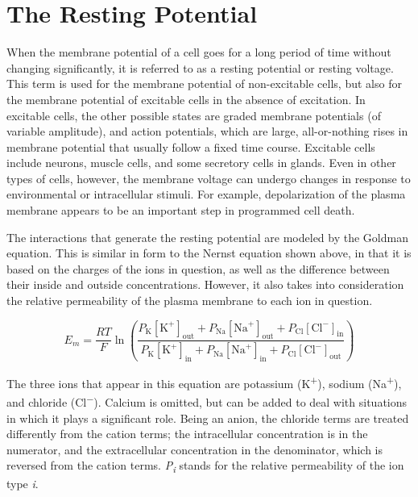 \hypertarget{the-resting-potential}{%
\section{The Resting Potential}\label{the-resting-potential}}

When the membrane potential of a cell goes for a long period of time without changing significantly, it is referred to as a resting potential or resting voltage. This term is used for the membrane potential of non-excitable cells, but also for the membrane potential of excitable cells in the absence of excitation. In excitable cells, the other possible states are graded membrane potentials (of variable amplitude), and action potentials, which are large, all-or-nothing rises in membrane potential that usually follow a fixed time course. Excitable cells include neurons, muscle cells, and some secretory cells in glands. Even in other types of cells, however, the membrane voltage can undergo changes in response to environmental or intracellular stimuli. For example, depolarization of the plasma membrane appears to be an important step in programmed cell death.

The interactions that generate the resting potential are modeled by the Goldman equation. This is similar in form to the Nernst equation shown above, in that it is based on the charges of the ions in question, as well as the difference between their inside and outside concentrations. However, it also takes into consideration the relative permeability of the plasma membrane to each ion in question.

\[ E_{m} = \frac{RT}{F} \ln{ \left( \frac{ P_{\mathrm{K}}[\mathrm{K}^{+}]_\mathrm{out} + P_{\mathrm{Na}}[\mathrm{Na}^{+}]_\mathrm{out} + P_{\mathrm{Cl}}[\mathrm{Cl}^{-}]_\mathrm{in}}{ P_{\mathrm{K}}[\mathrm{K}^{+}]_\mathrm{in} + P_{\mathrm{Na}}[\mathrm{Na}^{+}]_\mathrm{in} + P_{\mathrm{Cl}}[\mathrm{Cl}^{-}]_\mathrm{out}} \right) } \]

The three ions that appear in this equation are potassium (K\textsuperscript{+}), sodium (Na\textsuperscript{+}), and chloride (Cl\textsuperscript{−}). Calcium is omitted, but can be added to deal with situations in which it plays a significant role. Being an anion, the chloride terms are treated differently from the cation terms; the intracellular concentration is in the numerator, and the extracellular concentration in the denominator, which is reversed from the cation terms. \emph{P\textsubscript{i}} stands for the relative permeability of the ion type \emph{i}.

